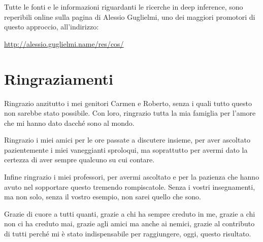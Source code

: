 \documentclass[12pt,a4paper,openright,twoside]{report}
\begin{document}
Tutte le fonti e le informazioni riguardanti le ricerche in deep inference, sono reperibili online sulla pagina di Alessio Guglielmi, uno dei maggiori promotori di questo approccio, all'indirizzo:
\begin{center}
	\url{http://alessio.guglielmi.name/res/cos/}
\end{center}


\clearpage{\pagestyle{empty}\cleardoublepage}




\clearpage{\pagestyle{empty}\cleardoublepage}
\chapter*{Ringraziamenti}
\thispagestyle{empty}

Ringrazio anzitutto i mei genitori Carmen e Roberto, senza i quali tutto questo non sarebbe stato possibile. Con loro, ringrazio tutta la mia famiglia per l'amore che mi hanno dato dacch\'e sono al mondo.

Ringrazio i miei amici per le ore passate a discutere insieme, per aver ascoltato pazientemente i miei vaneggianti sproloqui, ma soprattutto per avermi dato la certezza di aver sempre qualcuno su cui contare.

Infine ringrazio i miei professori, per avermi ascoltato e per la pazienza che hanno avuto nel sopportare questo tremendo rompiscatole. Senza i vostri insegnamenti, ma non solo, senza il vostro esempio, non sarei quello che sono.

Grazie di cuore a tutti quanti, grazie a chi ha sempre creduto in me, grazie a chi non ci ha creduto mai, grazie agli amici ma anche ai nemici, grazie al contributo di tutti perch\'e mi \`e stato indispensabile per raggiungere, oggi, questo risultato.
\end{document}
